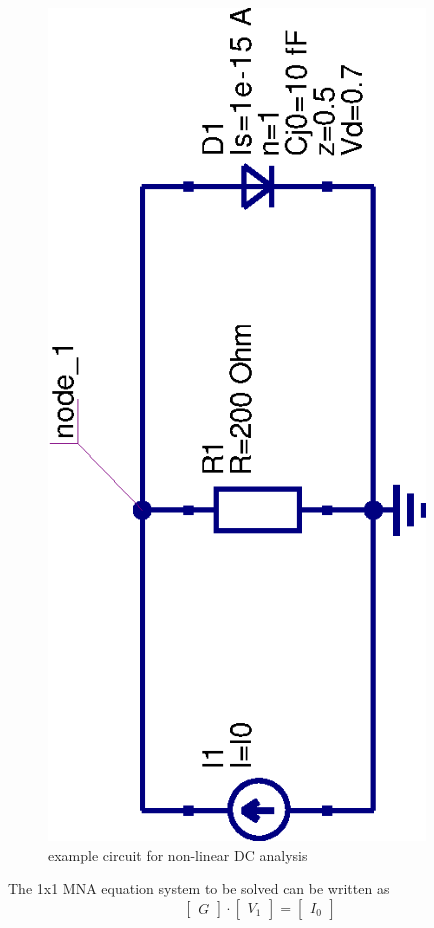 \documentclass[10pt]{report}
\begin{document}
\begin{figure}[ht]
\begin{center}
\includegraphics[angle=-90,width=10cm]{NLexample}
\end{center}
\caption{example circuit for non-linear DC analysis}
\label{fig:NLexample}
\end{figure}
\FloatBarrier

The 1x1 MNA equation system to be solved can be written as
\begin{equation}
\begin{bmatrix}
G
\end{bmatrix}
\cdot
\begin{bmatrix}
V_{1}
\end{bmatrix}
=
\begin{bmatrix}
I_{0}
\end{bmatrix}
\label{eq:NLmatrix}
\end{equation}
\end{document}
